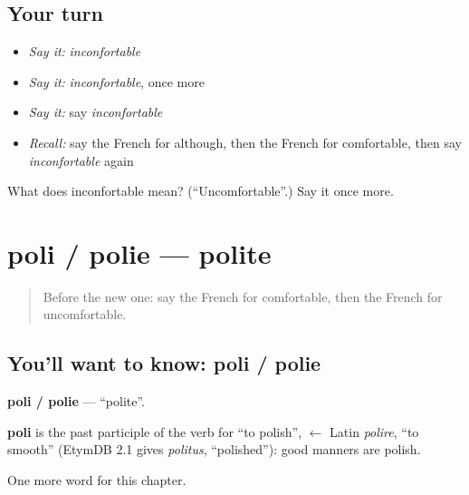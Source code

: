 \subsection*{Your turn}
\begin{itemize}
\raggedright
  \item \emph{Say it:} \emph{inconfortable}
  \item \emph{Say it:} \emph{inconfortable}, once more
  \item \emph{Say it:} say \emph{inconfortable}
  \item \emph{Recall:} say the French for although, then the French for comfortable, then say \emph{inconfortable} again
\end{itemize}

\begin{tcolorbox}[breakable,colback=teal!4,colframe=teal!35!black,title={Before you move on}]
What does inconfortable mean? (\textquotedblleft{}Uncomfortable\textquotedblright{}.) Say it once more.
\end{tcolorbox}
\section[poli / polie]{poli / polie — polite}

\label{lesson:FR-C159-poli-polie}



\begin{quote}
Before the new one: say the French for comfortable, then the French for uncomfortable.
\end{quote}

\subsection*{You'll want to know: poli / polie}
\textbf{poli / polie} — \textquotedblleft{}polite\textquotedblright{}.

\begin{cousinweb}
\textbf{poli} is the past participle of the verb for \textquotedblleft{}to polish\textquotedblright{}, $\leftarrow$ Latin \emph{polire}, \textquotedblleft{}to smooth\textquotedblright{} (EtymDB 2.1 gives \emph{politus}, \textquotedblleft{}polished\textquotedblright{}): good manners are polish.
\end{cousinweb}

\begin{grammarlens}[title={What you've built}]
One more word for this chapter.
\end{grammarlens}

